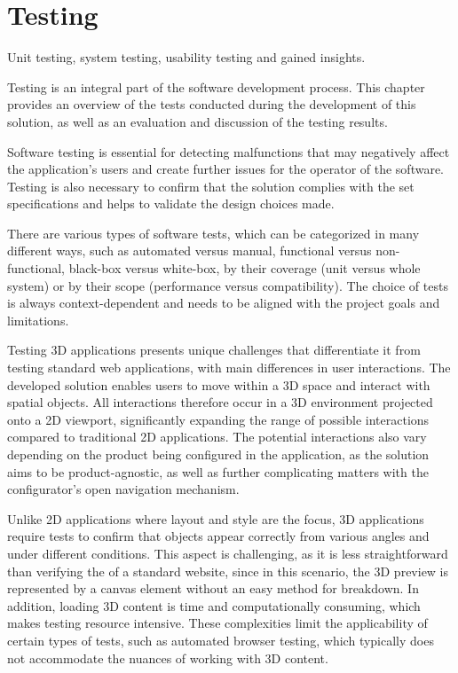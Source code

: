 \chapter{Testing}

\begin{chapterabstract}
    Unit testing, system testing, usability testing and gained insights.
\end{chapterabstract}

Testing is an integral part of the software development process. This chapter provides an overview of the tests conducted during the development of this solution, as well as an evaluation and discussion of the testing results.

Software testing is essential for detecting malfunctions that may negatively affect the application's users and create further issues for the operator of the software. Testing is also necessary to confirm that the solution complies with the set specifications and helps to validate the design choices made.~\cite{Homes2012}

There are various types of software tests, which can be categorized in many different ways, such as automated versus manual, functional versus non-functional, black-box versus white-box, by their coverage (unit versus whole system) or by their scope (performance versus compatibility). The choice of tests is always context-dependent and needs to be aligned with the project goals and limitations.~\cite{Krysik2023}

Testing 3D applications presents unique challenges that differentiate it from testing standard web applications, with main differences in user interactions. The developed solution enables users to move within a 3D space and interact with spatial objects. All interactions therefore occur in a 3D environment projected onto a 2D viewport, significantly expanding the range of possible interactions compared to traditional 2D applications. The potential interactions also vary depending on the product being configured in the application, as the solution aims to be product-agnostic, as well as further complicating matters with the configurator's open navigation mechanism.

Unlike 2D applications where layout and style are the focus, 3D applications require tests to confirm that objects appear correctly from various angles and under different conditions. This aspect is challenging, as it is less straightforward than verifying the  of a standard website, since in this scenario, the 3D preview is represented by a canvas element without an easy method for breakdown. In addition, loading 3D content is time and computationally consuming, which makes testing resource intensive. These complexities limit the applicability of certain types of tests, such as automated browser testing, which typically does not accommodate the nuances of working with 3D content.

